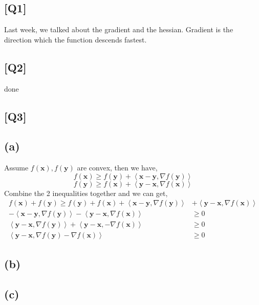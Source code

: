 \documentclass[12pt, a4 paper]{article}
\begin{document}
\begin{framed}
    \section{[Q1]}
    Last week, we talked about the gradient and the hessian. 
    Gradient is the direction which the function descends fastest.
\end{framed}

\begin{framed}
    \section{[Q2]}
    done
\end{framed}

\begin{framed}
    \section{[Q3]}
    \subsection{(a)}
    Assume $f(\boldsymbol{x}), f(\boldsymbol{y})$ are convex, then we have,
    $$
    f(\boldsymbol{x}) \geq f(\boldsymbol{y}) + \left< \boldsymbol{x}
    - \boldsymbol{y}, \nabla f(\boldsymbol{y}) \right>
    $$
    $$
    f(\boldsymbol{y}) \geq f(\boldsymbol{x}) + \left< \boldsymbol{y}
    - \boldsymbol{x}, \nabla f(\boldsymbol{x}) \right>
    $$
    \indent Combine the 2 inequalities together and we can get,
    \begin{align*}
        f(\boldsymbol{x}) + f(\boldsymbol{y}) \geq f(\boldsymbol{y})
        + f(\boldsymbol{x}) + \left< \boldsymbol{x}-\boldsymbol{y},
        \nabla f(\boldsymbol{y}) \right>  &+ \left< \boldsymbol{y}-
        \boldsymbol{x}, \nabla f(\boldsymbol{x}) \right>  \\
        -\left< \boldsymbol{x}-\boldsymbol{y},
        \nabla f(\boldsymbol{y}) \right> - \left< \boldsymbol{y}-\boldsymbol{x},
        \nabla f(\boldsymbol{x}) \right> &\geq 0 \\
        \left< \boldsymbol{y}-\boldsymbol{x}, \nabla f(\boldsymbol{y}) \right>
        + \left< \boldsymbol{y}-\boldsymbol{x}, -\nabla f(\boldsymbol{x}) \right>
        &\geq 0 \\
        \left< \boldsymbol{y} - \boldsymbol{x}, \nabla f(\boldsymbol{y})
        - \nabla f(\boldsymbol{x}) \right> &\geq 0
    \end{align*}

    \subsection{(b)}
    \subsection{(c)}
\end{framed}
\end{document}
